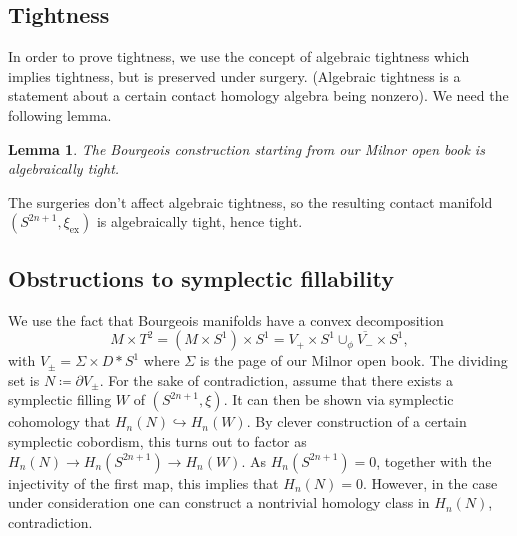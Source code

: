 \documentclass{amsart}
\newtheorem{lemma}{Lemma}
\newtheorem{definition}{Definition}
\begin{document}
\subsection*{Tightness}

In order to prove tightness, we use the concept of algebraic tightness which implies tightness,
but is preserved under surgery.
(Algebraic tightness is a statement about a certain contact homology algebra being nonzero).
We need the following lemma.
\begin{lemma}
    The Bourgeois construction starting from our Milnor open book
    is algebraically tight.
\end{lemma}
The surgeries don't affect algebraic tightness, so the resulting
contact manifold $(S^{2n+1}, \xi_\mathrm{ex})$ is algebraically tight, hence tight.


\subsection*{Obstructions to symplectic fillability}
We use the fact that Bourgeois manifolds have a convex decomposition
\[
    M \times T^2 = (M \times S^1) \times S^1 = V_+ \times S^1 \cup_\phi \overline{V_-} \times S^1,  
\]
with $V_{\pm} = \Sigma \times D*S^1$ where $\Sigma$ is the page of our Milnor open book.
The dividing set is $N \coloneqq \partial V_{\pm}$.
For the sake of contradiction, assume that there exists a symplectic filling $W$ of $(S^{2n+1}, \xi)$.
It can then be shown via symplectic cohomology that $H_n(N) \hookrightarrow H_n(W)$.
By clever construction of a certain symplectic cobordism, this turns out to factor
as $H_n(N) \to H_n(S^{2n+1}) \to H_n(W)$.
As $H_n(S^{2n+1}) = 0$, together with the injectivity of the first map,
this implies that $H_n(N) = 0$.
However, in the case under consideration one can construct a nontrivial homology class
in $H_n(N)$, contradiction.



\end{document}

